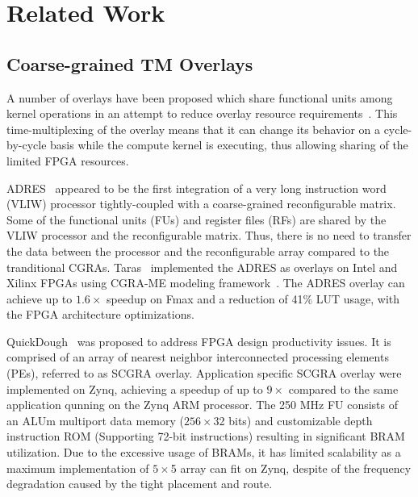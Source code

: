 \section{Related Work}


\subsection{Coarse-grained TM Overlays}
A number of overlays have been proposed which share functional units among kernel operations in an attempt to reduce overlay resource requirements~\cite{severance2013embedded, liu2015quickdough, taras2019impact}.
This time-multiplexing of the overlay means that it can change its behavior on a cycle-by-cycle basis while the compute kernel is executing, thus allowing sharing of the limited FPGA resources.

ADRES~\cite{mei2003adres} appeared to be the first integration of a very long instruction word (VLIW) processor tightly-coupled with a coarse-grained reconfigurable matrix. 
Some of the functional units (FUs) and register files (RFs) are shared by the VLIW processor and the reconfigurable matrix. 
Thus, there is no need to transfer the data between the processor and the reconfigurable array compared to the tranditional CGRAs. 
Taras~\cite{taras2019impact} implemented the ADRES as overlays on Intel and Xilinx FPGAs using CGRA-ME modeling framework~\cite{chin2017cgra}. 
The ADRES overlay can achieve up to $1.6\times$ speedup on Fmax and a reduction of 41\% LUT usage, with the FPGA architecture optimizations. 


QuickDough~\cite{liu2015quickdough} was proposed to address FPGA design productivity issues. 
It is comprised of an array of nearest neighbor interconnected processing elements (PEs), referred to as SCGRA overlay.  
Application specific SCGRA overlay were implemented on Zynq, achieving a speedup of up to $9\times$ compared to the same application qunning on the Zynq ARM processor. 
The 250 MHz FU consists of an ALUm multiport data memory ($256\times$32 bits) and customizable depth instruction ROM (Supporting 72-bit instructions) resulting in significant BRAM utilization. 
Due to the excessive usage of BRAMs, it has limited scalability as a maximum implementation of $5\times$5 array can fit on Zynq, despite of the frequency degradation caused by the tight placement and route. 


